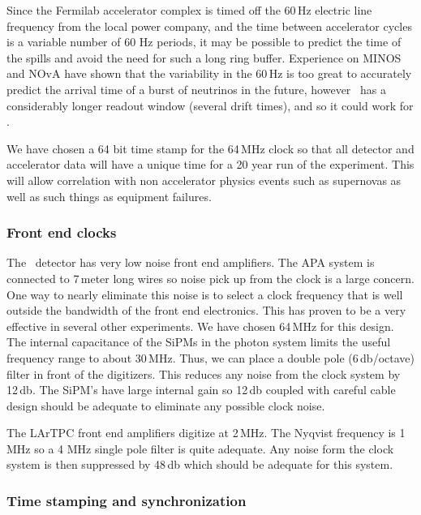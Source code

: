 Since the Fermilab accelerator complex is timed off the 60\,Hz electric
line frequency from the local power company, and the time between
accelerator cycles is a variable number of 60 Hz periods, it may be
possible to predict the time of the spills and avoid the need for such
a long ring buffer.  Experience on MINOS and NOvA have shown that the
variability in the 60\,Hz is too great to accurately predict the
arrival time of a burst of neutrinos in the future, however \LBNE\ has a
considerably longer readout window (several drift times), and so it
could work for \LBNE.

We have chosen a 64 bit time stamp for the 64\,MHz clock so that all
detector and accelerator data will have a unique time for a 20 year
run of the experiment.  This will allow correlation with non
accelerator physics events such as supernovas as well as such things
as equipment failures.

\subsubsection{Front end clocks}

The \LBNE\ detector has very low noise front end amplifiers.  The APA
system is connected to 7\,meter long wires so noise pick up from the
clock is a large concern.  One way to nearly eliminate this noise is
to select a clock frequency that is well outside the bandwidth of the
front end electronics.  This has proven to be a very effective in
several other experiments.  We have chosen 64\,MHz for this design.
The internal capacitance of the SiPMs in the photon system limits the
useful frequency range  to
about 30\,MHz.  Thus, we can place a double pole (6\,db/octave) filter
in front of the digitizers. This reduces any noise from the clock
system by 12\,db.  The SiPM's have large internal gain so 12\,db
coupled with careful cable design should be adequate to eliminate any
possible clock noise.

The LArTPC front end amplifiers digitize at 2\,MHz.  The Nyqvist
frequency is 1 MHz so a 4 MHz single pole filter is quite adequate.
Any noise form the clock system is then suppressed by 48\,db which
should be adequate for this system.

\subsubsection{Time stamping and synchronization}

